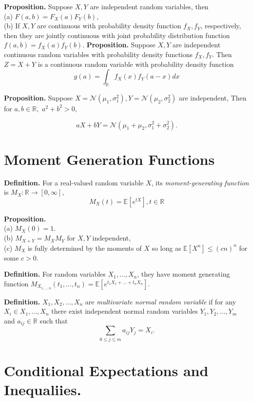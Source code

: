 \documentclass{article}[11pt]
\begin{document}
\textbf{Proposition.} Suppose $X,Y$ are independent random variables, then \\
(a) $F(a,b) = F_X(a)F_Y(b),$ \\
(b) If $X, Y$ are continuous with probability density function $f_X, f_Y$, respectively,
then they are jointly continuous with joint probability distribution function $f(a,b) = f_X(a)f_Y(b).$
\textbf{Proposition.} Suppose $X,Y$ are independent continuous random variables with probability density functions $f_X, f_Y.$
Then $Z = X + Y$ is a continuous random variable with probability density function
\[
  g(a) = \int_{\mathbb{R}}f_X(x)f_Y(a-x)dx
\]

\textbf{Proposition.} Suppose $X = \mathcal{N}(\mu_1, \sigma_1^2), Y = \mathcal{N}(\mu_2, \sigma_2^2)$ are independent, Then for $a,b \in \mathbb{R},$
$a^2 + b^2 > 0,$

\[
  aX+bY = \mathcal{N}(\mu_1+\mu_2, \sigma_1^2 + \sigma_2^2).
\]
\section{Moment Generation Functions}

\textbf{Definition.} For a real-valued random variable $X$, its \emph{moment-generating function}
is $M_X: \mathbb{R}\to [0, \infty]$, $$M_X(t) = \mathbb{E}[e^{tX}], t \in \mathbb{R}$$

\par

\textbf{Proposition.} \\ 
(a) $M_X(0) = 1$. \\
(b) $M_{X+Y} = M_XM_Y$ for $X,Y$ independent, \\
(c) $M_X$ is fully determined by the moments of $X$ so long as 
$\mathbb{E}[X^n]\leq(cn)^n$ for some $c >0$.


\par
\textbf{Definition.} For random variables $X_1, \dots, X_n$, they have moment generating function
$M_{X_{1, \dots, n}}(t_1, \dots, t_n) = \mathbb{E}[e^{t_1X_1 + \dots + t_nX_n}].$

\par

\textbf{Definition.} $X_1, X_2, \dots, X_n$ are \emph{multivariate normal random variable} if for any $X_i \in {X_1, \dots, X_n}$
                     there exist independent normal random variables $Y_1, Y_2, \dots, Y_m$ and $a_{ij} \in \mathbb{R}$ such that
                     $$\sum_{0\leq j \leq m}a_{ij}Y_j = X_i.$$

 
\section{Conditional Expectations and Inequaliies.}
\end{document}
